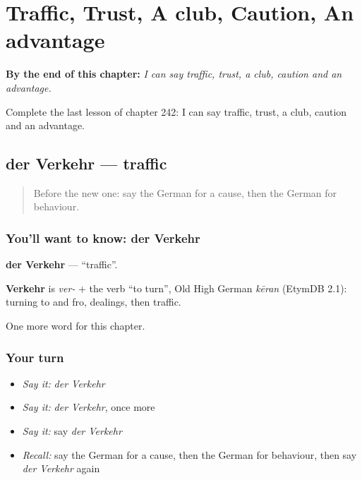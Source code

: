 
\chapter{Traffic, Trust, A club, Caution, An advantage}
\label{ch:ge-traffic-trust-a-club-caution-an-advantage}

\begin{chapteropening}
\textbf{By the end of this chapter:} \emph{I can say traffic, trust, a club, caution and an advantage.}

Complete the last lesson of chapter 242: I can say traffic, trust, a club, caution and an advantage.
\end{chapteropening}

\section[der Verkehr]{der Verkehr — traffic}

\label{lesson:GE-C242-verkehr}



\begin{quote}
Before the new one: say the German for a cause, then the German for behaviour.
\end{quote}

\subsection*{You'll want to know: der Verkehr}
\textbf{der Verkehr} — \textquotedblleft{}traffic\textquotedblright{}.

\begin{cousinweb}
\textbf{Verkehr} is \emph{ver-} + the verb \textquotedblleft{}to turn\textquotedblright{}, Old High German \emph{kēran} (EtymDB 2.1): turning to and fro, dealings, then traffic.
\end{cousinweb}

\begin{grammarlens}[title={What you've built}]
One more word for this chapter.
\end{grammarlens}

\subsection*{Your turn}
\begin{itemize}
\raggedright
  \item \emph{Say it:} \emph{der Verkehr}
  \item \emph{Say it:} \emph{der Verkehr}, once more
  \item \emph{Say it:} say \emph{der Verkehr}
  \item \emph{Recall:} say the German for a cause, then the German for behaviour, then say \emph{der Verkehr} again
\end{itemize}

